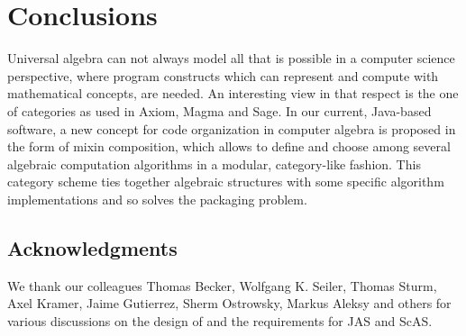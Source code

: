 \documentclass{llncs}
\begin{document}
\section{Conclusions} %

Universal algebra can not always model all that is possible in a computer
science perspective, where program constructs which can represent and compute
with mathematical concepts, are needed. An interesting view in that respect is
the one of categories as used in Axiom, Magma and Sage. In our current,
Java-based software, a new concept for code organization in computer algebra is
proposed in the form of mixin composition, which allows to define and choose
among several algebraic computation algorithms in a modular, category-like
fashion. This category scheme ties together algebraic structures with 
some specific algorithm implementations and so solves the packaging problem.

\subsection*{Acknowledgments} %

We thank our colleagues Thomas Becker, Wolfgang K. Seiler, Thomas
Sturm, Axel Kramer, Jaime Gutierrez, Sherm Ostrowsky, Markus Aleksy and
others for various discussions on the design of and the requirements
for JAS and ScAS. 




\end{document}
